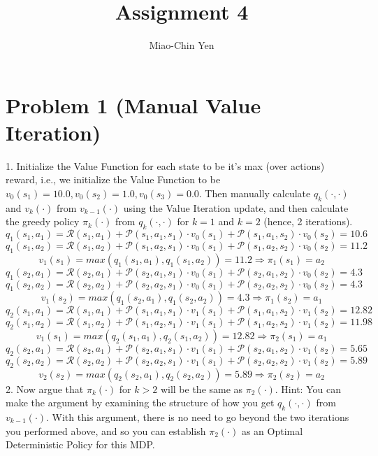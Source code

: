 \documentclass{article}
\title{Assignment 4}
\author{Miao-Chin Yen}
\begin{document}
\maketitle

\section*{Problem 1 (Manual Value Iteration)}
1. Initialize the Value Function for each state to be it's max (over actions) reward, i.e., we initialize the Value Function to be $v_{0}\left(s_{1}\right)=10.0, v_{0}\left(s_{2}\right)=1.0, v_{0}\left(s_{3}\right)=0.0$. Then manually calculate $q_{k}(\cdot, \cdot)$ and $v_{k}(\cdot)$ from $v_{k-1}(\cdot)$ using the Value Iteration update, and then calculate the greedy policy $\pi_{k}(\cdot)$ from $q_{k}(\cdot, \cdot)$ for $k=1$ and $k=2$ (hence, 2 iterations).
$$q_1(s_1,a_1) = \mathcal{R}(s_1, a_1) + \mathcal{P}(s_1, a_1,s_1) \cdot v_0(s_1)+\mathcal{P}(s_1, a_1,s_2) \cdot v_0(s_2) = 10.6$$
$$q_1(s_1,a_2) = \mathcal{R}(s_1, a_2) + \mathcal{P}(s_1, a_2,s_1) \cdot v_0(s_1)+\mathcal{P}(s_1, a_2,s_2) \cdot v_0(s_2) = 11.2$$
$$v_1(s_1) = max(q_1(s_1,a_1), q_1(s_1,a_2)) = 11.2 \Rightarrow \pi_1(s_1) = a_2$$
$$q_1(s_2,a_1) = \mathcal{R}(s_2, a_1) + \mathcal{P}(s_2, a_1,s_1) \cdot v_0(s_1)+\mathcal{P}(s_2,a_1,s_2) \cdot v_0(s_2) = 4.3$$
$$q_1(s_2,a_2) = \mathcal{R}(s_2, a_2) + \mathcal{P}(s_2, a_2,s_1) \cdot v_0(s_1)+\mathcal{P}(s_2, a_2,s_2) \cdot v_0(s_2) = 4.3$$
$$v_1(s_2) = max(q_1(s_2,a_1), q_1(s_2,a_2)) = 4.3 \Rightarrow \pi_1(s_2) = a_1$$
$$q_2(s_1,a_1) = \mathcal{R}(s_1, a_1) + \mathcal{P}(s_1, a_1,s_1) \cdot v_1(s_1)+\mathcal{P}(s_1, a_1,s_2) \cdot v_1(s_2) = 12.82$$
$$q_2(s_1,a_2) = \mathcal{R}(s_1, a_2) + \mathcal{P}(s_1, a_2,s_1) \cdot v_1(s_1)+\mathcal{P}(s_1, a_2,s_2) \cdot v_1(s_2) = 11.98$$
$$v_1(s_1) = max(q_2(s_1,a_1), q_2(s_1,a_2)) = 12.82 \Rightarrow \pi_2(s_1) = a_1$$
$$q_2(s_2,a_1) = \mathcal{R}(s_2, a_1) + \mathcal{P}(s_2, a_1,s_1) \cdot v_1(s_1)+\mathcal{P}(s_2,a_1,s_2) \cdot v_1(s_2) = 5.65$$
$$q_2(s_2,a_2) = \mathcal{R}(s_2, a_2) + \mathcal{P}(s_2, a_2,s_1) \cdot v_1(s_1)+\mathcal{P}(s_2, a_2,s_2) \cdot v_1(s_2) = 5.89$$
$$v_2(s_2) = max(q_2(s_2,a_1), q_2(s_2,a_2)) = 5.89 \Rightarrow \pi_2(s_2) = a_2$$
2. Now argue that $\pi_{k}(\cdot)$ for $k>2$ will be the same as $\pi_{2}(\cdot)$. Hint: You can make the argument by examining the structure of how you get $q_{k}(\cdot, \cdot)$ from $v_{k-1}(\cdot)$. With this argument, there is no need to go beyond the two iterations you performed above, and so you can establish $\pi_{2}(\cdot)$ as an Optimal Deterministic Policy for this MDP.
\end{document}
